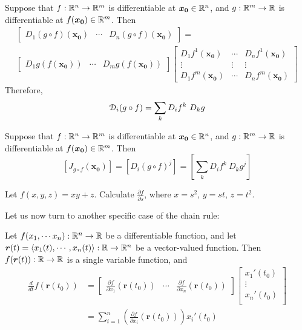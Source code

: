 \begin{example}
    Suppose that $f : \mathbb{R}^n \to \mathbb{R}^m$ is differentiable at $\bm{x_0} \in \mathbb{R}^n$, and $g: \mathbb{R}^m \to \mathbb{R}$ is differentiable at $f(\bm{x_0}) \in \mathbb{R}^m$. Then
    \begin{multline}
        \begin{bmatrix}
D_1(g \circ f)(\bm{x_0}) & \cdots & D_n(g \circ f)(\bm{x_0}) 
\end{bmatrix} = \\
\begin{bmatrix}
D_1g(f(\bm{x_0})) & \cdots & D_mg(f(\bm{x_0})) 
\end{bmatrix}
\begin{bmatrix}
D_1f^1(\bm{x_0}) & \cdots & D_nf^1(\bm{x_0}) \\
\vdots & \vdots & \vdots\\
D_1f^m(\bm{x_0})  & \cdots & D_nf^m(\bm{x_0}) 
\end{bmatrix}
    \end{multline}
    Therefore,
    $$\mathcal{D}_i(g \circ f) = \sum_k  D_i f^k \ D_k g$$
    \end{example}

\begin{corollary}
    Suppose that $f : \mathbb{R}^n \to \mathbb{R}^m$ is differentiable at $\bm{x_0} \in \mathbb{R}^n$, and $g: \mathbb{R}^m \to \mathbb{R}$ is differentiable at $f(\bm{x_0}) \in \mathbb{R}^m$. Then
$$\left[J_{g\circ f}(\bm{x_0})\right] = \left[D_i(g \circ f)^j\right] = \left[\sum_k  D_i f^k \ D_k g^j\right]$$
\end{corollary} 

\begin{example}
    Let $f(x,y,z) = xy + z$.  Calculate $\frac{\partial f}{\partial s}$, where $x = s^2$, $y = st$, $z = t^2$.
\end{example}


Let us now turn to another specific case of the chain rule:  

\begin{proposition}
    Let $f(x_1, \cdots x_n) : \mathbb{R}^n \to \mathbb{R}$ be a differentiable function, and let $\bm{r}(t) = \langle x_1(t), \cdots, x_n(t) \rangle : \mathbb{R} \to \mathbb{R}^n$ be a vector-valued function.  Then $f(\bm{r}(t)) : \mathbb{R} \to \mathbb{R}$ is a single variable function, and 
    \begin{align*}
        \frac{d}{dt}f(\bm{r}(t_0)) &= \begin{bmatrix}
\frac{\partial f}{\partial x_1}(\bm{r}(t_0)) & \cdots & \frac{\partial f}{\partial x_n}(\bm{r}(t_0))
\end{bmatrix} \begin{bmatrix}
x_1'(t_0) \\
\vdots \\
x_n'(t_0) \\
\end{bmatrix} \\
&= \sum_{i=1}^n
\left(\frac{\partial f}{\partial x_i}(\bm{r}(t_0)) \right) x_i'(t_0)
    \end{align*}
    \end{proposition}


